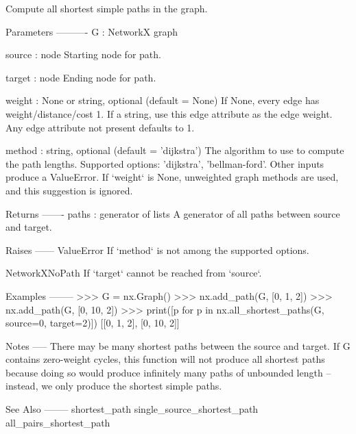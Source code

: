 \begin{DoxyVerb}Compute all shortest simple paths in the graph.

Parameters
----------
G : NetworkX graph

source : node
   Starting node for path.

target : node
   Ending node for path.

weight : None or string, optional (default = None)
   If None, every edge has weight/distance/cost 1.
   If a string, use this edge attribute as the edge weight.
   Any edge attribute not present defaults to 1.

method : string, optional (default = 'dijkstra')
   The algorithm to use to compute the path lengths.
   Supported options: 'dijkstra', 'bellman-ford'.
   Other inputs produce a ValueError.
   If `weight` is None, unweighted graph methods are used, and this
   suggestion is ignored.

Returns
-------
paths : generator of lists
    A generator of all paths between source and target.

Raises
------
ValueError
    If `method` is not among the supported options.

NetworkXNoPath
    If `target` cannot be reached from `source`.

Examples
--------
>>> G = nx.Graph()
>>> nx.add_path(G, [0, 1, 2])
>>> nx.add_path(G, [0, 10, 2])
>>> print([p for p in nx.all_shortest_paths(G, source=0, target=2)])
[[0, 1, 2], [0, 10, 2]]

Notes
-----
There may be many shortest paths between the source and target.  If G
contains zero-weight cycles, this function will not produce all shortest
paths because doing so would produce infinitely many paths of unbounded
length -- instead, we only produce the shortest simple paths.

See Also
--------
shortest_path
single_source_shortest_path
all_pairs_shortest_path
\end{DoxyVerb}
 \mbox{\label{namespacenetworkx_1_1algorithms_1_1shortest__paths_1_1generic_a9fd450807fac1acf3a78c14109ea672a}} 
